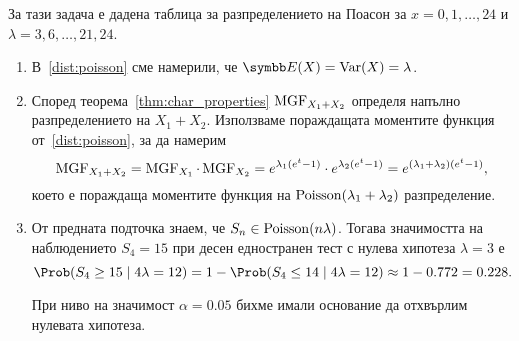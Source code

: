 \documentclass[numbers=endperiod, bibliography=totocnumbered]{scrartcl}
\begin{document}
\begin{remark}
  За тази задача е дадена таблица за разпределението на Поасон за \( x = 0, 1, \ldots, 24 \) и \( \lambda = 3, 6, \ldots, 21, 24 \).
\end{remark}

\begin{solution}
  \mbox{}
  \begin{enumerate}[label=\alph*)]
    \item В~\ref{dist:poisson} сме намерили, че \( \Expect(X) = \Var(X) = \lambda \).
    \item Според теорема~\ref{thm:char_properties} \( \operatorname{MGF}_{X_1 + X_2} \) определя напълно разпределението на \( X_1 + X_2 \). Използваме пораждащата моментите функция от~\ref{dist:poisson}, за да намерим
    \begin{equation*}
      \operatorname{MGF}_{X_1 + X_2}
      =
      \operatorname{MGF}_{X_1} \cdot \operatorname{MGF}_{X_2}
      =
      e^{\lambda_1 (e^t - 1)} \cdot e^{\lambda_2 (e^t - 1)}
      =
      e^{(\lambda_1 + \lambda_2) (e^t - 1)},
    \end{equation*}
    което е пораждаща моментите функция на \( \operatorname{Poisson}(\lambda_1 + \lambda_2) \) разпределение.

    \item От предната подточка знаем, че \( S_n \in \operatorname{Poisson}(n \lambda) \). Тогава значимостта на наблюдението \( S_4 = 15 \) при десен едностранен тест с нулева хипотеза \( \lambda = 3 \) е
    \begin{equation*}
      \Prob(S_4 \geq 15 \mid 4\lambda = 12)
      =
      1 - \Prob(S_4 \leq 14 \mid 4\lambda = 12)
      \approx
      1 - 0.772
      =
      0.228.
    \end{equation*}

    При ниво на значимост \( \alpha = 0.05 \) бихме имали основание да отхвърлим нулевата хипотеза.
  \end{enumerate}
\end{solution}

\printbibliography
\end{document}
